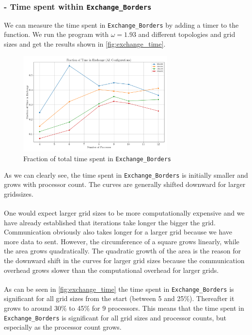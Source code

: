 \subsubsection{ - Time spent within \texttt{Exchange\_Borders}}
We can measure the time spent in \texttt{Exchange\_Borders} by adding a timer to the function. We run the program with $\omega = 1.93$ and different topologies and grid sizes and get the results shown in \autoref{fig:exchange_time}.
\begin{figure}[H]
    \centering
    \includegraphics[width=0.7\textwidth]{../fig/lab1/fraction_exchange_comparison_connected.png}
    \caption{Fraction of total time spent in \texttt{Exchange\_Borders}}
    \label{fig:exchange_time}
\end{figure}
As we can clearly see, the time spent in \texttt{Exchange\_Borders} is initially smaller and grows with processor count. The curves are generally shifted downward for larger gridssizes. \\

\\
One would expect larger grid sizes to be more computationally expensive and we have already established that iterations take longer the bigger the grid. Communication obviously also takes longer for a larger grid because we have more data to sent. However, the circumference of a square grows linearly, while the area grows quadratically. The quadratic growth of the area is the reason for the downward shift in the curves for larger grid sizes because the communication overhead grows slower than the computational overhead for larger grids.\\

\\
As can be seen in \autoref{fig:exchange_time} the time spent in \texttt{Exchange\_Borders} is significant for all grid sizes from the start (between 5 and 25\%). Thereafter it grows to around 30\% to 45\% for 9 processors. This means that the time spent in \texttt{Exchange\_Borders} is significant for all grid sizes and processor counts, but especially as the processor count grows.

